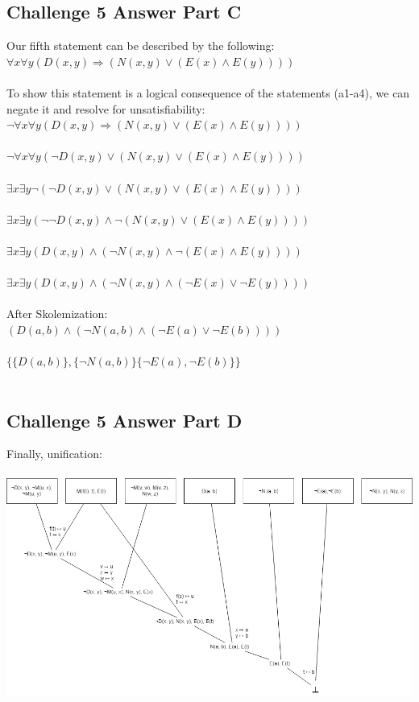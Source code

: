 \documentclass[12pt]{article}
\newcommand{\impl}{\mathbin{\Rightarrow}}
\begin{document}
\subsection*{Challenge 5 Answer Part C}
Our fifth statement can be described by the following:\\
$\forall x \forall y (D(x, y) \impl (N(x, y) \lor (E(x) \land E(y))))$\\\\
To show this statement is a logical consequence of the statements (a1-a4), we can negate it and resolve for unsatisfiability:\\
$\neg\forall x \forall y (D(x, y) \impl (N(x, y) \lor (E(x) \land E(y))))$\\\\
$\neg\forall x \forall y (\neg D(x, y) \lor (N(x, y) \lor (E(x) \land E(y))))$\\\\
$\exists x \exists y \neg(\neg D(x, y) \lor (N(x, y) \lor (E(x) \land E(y))))$\\\\
$\exists x \exists y (\neg\neg D(x, y) \land \neg(N(x, y) \lor (E(x) \land E(y))))$\\\\
$\exists x \exists y (D(x, y) \land (\neg N(x, y) \land \neg(E(x) \land E(y))))$\\\\
$\exists x \exists y (D(x, y) \land (\neg N(x, y) \land (\neg E(x) \lor \neg E(y))))$\\\\
After Skolemization:\\
$(D(a, b) \land (\neg N(a, b) \land (\neg E(a) \lor \neg E(b))))$\\\\
$\{\{D(a, b)\}, \{\neg N(a, b)\} \{\neg E(a),\neg E(b)\}\}$\\\\
\pagebreak
\subsection*{Challenge 5 Answer Part D}
Finally, unification:\\\\
\includegraphics[width=\textwidth]{5}
\end{document}
